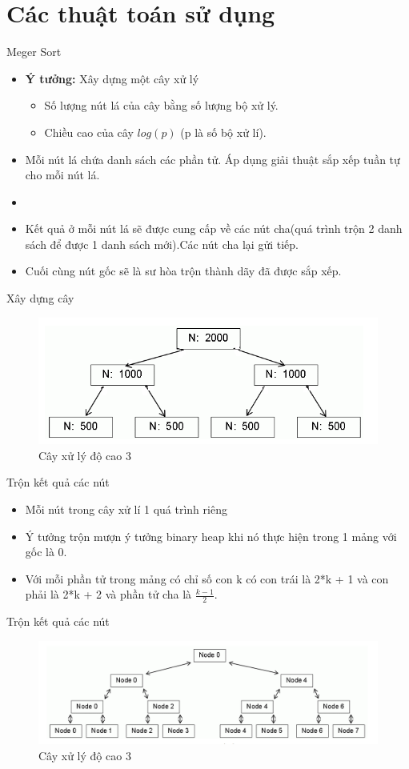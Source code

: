 \documentclass{beamer}
\newcommand{\bi}{\begin{itemize}}
\newcommand{\ei}{\end{itemize}}
\begin{document}
\section{Các thuật toán sử dụng}
\begin{frame}{Meger Sort}
\bi
\item \textbf{Ý tưởng:} Xây dựng một cây xử lý
\bi
\item Số lượng nút lá của cây bằng số lượng bộ xử lý.
\item Chiều cao của cây $log(p)$ (p là số bộ xử lí).
\ei
\item Mỗi nút lá chứa danh sách các phần tử. Áp dụng giải thuật sắp xếp tuần tự cho mỗi nút lá.
\item 
\item Kết quả ở mỗi nút lá sẽ được cung cấp về các nút cha(quá trình trộn 2 danh sách để được 1 danh sách mới).Các nút cha lại gửi tiếp.
\item Cuối cùng nút gốc sẽ là sư hòa trộn thành dãy đã được sắp xếp.
\ei
\end{frame}
\begin{frame}{Xây dựng cây}
\begin{figure}[H]
\includegraphics[scale=0.6]{img1.png}
\caption{Cây xử lý độ cao 3}
\end{figure}
\end{frame}
\begin{frame}{Trộn kết quả các nút}
\bi
\item Mỗi nút trong cây xử lí 1 quá trình riêng
\item Ý tưởng trộn mượn ý tưởng binary heap khi nó thực hiện trong 1 mảng với gốc là 0.
\item Với mỗi phần tử trong mảng có chỉ số con k có con trái là 2*k + 1 và con phải là 2*k + 2 và phần tử cha là $\frac{k-1}{2}$.
\ei
\end{frame}\begin{frame}{Trộn kết quả các nút}
\begin{figure}[H]
\includegraphics[scale=0.4]{img2.png}
\caption{Cây xử lý độ cao 3}
\end{figure}
\end{frame}
\end{document}
